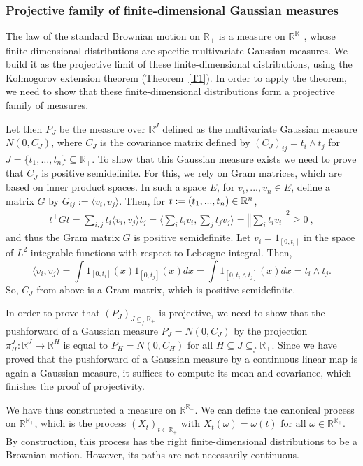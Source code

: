 \documentclass[lean]{Draft}
\begin{document}
\subsubsection{Projective family of finite-dimensional Gaussian measures}

The law of the standard Brownian motion on $\mathbb{R}_+$ is a measure on $\mathbb{R}^{\mathbb{R}_+}$, whose finite-dimensional distributions are specific multivariate Gaussian measures.
We build it as the projective limit of these finite-dimensional distributions, using the Kolmogorov extension theorem (Theorem~\ref{T1}).
In order to apply the theorem, we need to show that these finite-dimensional distributions form a projective family of measures.

Let then $P_J$ be the measure over $\mathbb{R}^J$ defined as the multivariate Gaussian measure $N(0, C_J)$, where $C_J$ is the covariance matrix defined by $(C_J)_{ij} = t_i \wedge t_j$ for $J = \{t_1, \dots, t_n\} \subseteq \mathbb{R}_+$.
To show that this Gaussian measure exists we need to prove that $C_J$ is positive semidefinite.
For this, we rely on Gram matrices, which are based on inner product spaces. In such a space $E$, for $v_i,...,v_n \in E$, define a matrix $G$ by $G_{ij} := \langle v_i, v_j\rangle$.
Then, for $t :=(t_1,...,t_n) \in \mathbb{R}^n$,
\begin{align*}
  t^\top G t = \sum_{i,j} t_i \langle v_i, v_j\rangle t_j = \Big\langle \sum_i t_i v_i, \sum_j t_j v_j\Big\rangle = \left\Vert \sum_i t_i v_i \right\Vert^2 \geq 0
  \: ,
\end{align*}
and thus the Gram matrix $G$ is positive semidefinite.
Let $v_i = 1_{[0,t_i]}$ in the space of $L^2$ integrable functions with respect to Lebesgue integral. Then,
$$ \langle v_i, v_j \rangle = \int 1_{[0,t_i]}(x) 1_{[0,t_j]}(x) dx = \int 1_{[0,t_i \wedge t_j]}(x) dx = t_i \wedge t_j.$$
So, $C_J$ from above is a Gram matrix, which is positive semidefinite.

In order to prove that $(P_J)_{J \subseteq_f \mathbb{R}_+}$ is projective, we need to show that the pushforward of a Gaussian measure $P_J = N(0, C_J)$ by the projection $\pi_H^J : \mathbb{R}^J \to \mathbb{R}^H$ is equal to $P_H = N(0, C_H)$ for all $H \subseteq J \subseteq_f \mathbb{R}_+$.
Since we have proved that the pushforward of a Gaussian measure by a continuous linear map is again a Gaussian measure, it suffices to compute its mean and covariance, which finishes the proof of projectivity.

We have thus constructed a measure on $\mathbb{R}^{\mathbb{R}_+}$.
We can define the canonical process on $\mathbb{R}^{\mathbb{R}_+}$, which is the process $(X_t)_{t \in \mathbb{R}_+}$ with $X_t(\omega) = \omega(t)$ for all $\omega \in \mathbb{R}^{\mathbb{R}_+}$.
By construction, this process has the right finite-dimensional distributions to be a Brownian motion.
However, its paths are not necessarily continuous.
\end{document}
